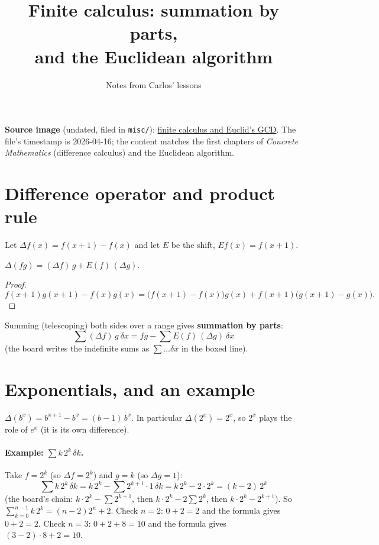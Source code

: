 \documentclass[11pt]{article}
\title{Finite calculus: summation by parts,\\ and the Euclidean algorithm}
\author{Notes from Carlos' lessons}
\date{}
\begin{document}
\maketitle

\textbf{Source image} (undated, filed in \texttt{misc/}):
\href{../misc/finite-calculus-summation-by-parts-and-euclid-gcd.png}{finite calculus and Euclid's GCD}.
The file's timestamp is 2026-04-16; the content matches the first chapters of \emph{Concrete Mathematics} (difference calculus) and the Euclidean algorithm.

\section{Difference operator and product rule}

Let $\Delta f(x)=f(x+1)-f(x)$ and let $E$ be the shift, $Ef(x)=f(x+1)$.

\begin{theorem}
$\Delta(fg)=(\Delta f)\,g+E(f)\,(\Delta g)$.
\end{theorem}
\begin{proof}
\[
f(x{+}1)g(x{+}1)-f(x)g(x)=\bigl(f(x{+}1)-f(x)\bigr)g(x)+f(x{+}1)\bigl(g(x{+}1)-g(x)\bigr).
\]
\end{proof}

Summing (telescoping) both sides over a range gives \textbf{summation by parts}:
\[
\sum(\Delta f)\,g\ \delta x=fg-\sum E(f)\,(\Delta g)\ \delta x
\]
(the board writes the indefinite sums as $\sum\dots\delta x$ in the boxed line).

\section{Exponentials, and an example}

$\Delta(b^x)=b^{x+1}-b^x=(b-1)\,b^x$. In particular $\Delta(2^x)=2^x$, so $2^x$ plays the role of $e^x$ (it is its own difference).

\paragraph{Example: $\sum k\,2^k\,\delta k$.} Take $f=2^k$ (so $\Delta f=2^k$) and $g=k$ (so $\Delta g=1$):
\[
\sum k\,2^k\,\delta k=k\,2^k-\sum2^{k+1}\cdot1\,\delta k=k\,2^k-2\cdot2^k=(k-2)\,2^k
\]
(the board's chain: $k\cdot2^k-\sum2^{k+1}$, then $k\cdot2^k-2\sum2^k$, then $k\cdot2^k-2^{k+1}$). So $\sum_{k=0}^{n-1}k\,2^k=(n-2)2^n+2$. Check $n=2$: $0+2=2$ and the formula gives $0+2=2$. Check $n=3$: $0+2+8=10$ and the formula gives $(3-2)\cdot8+2=10$.
\end{document}
